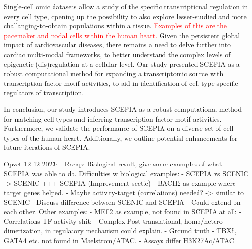 Single-cell omic datasets allow a study of the specific transcriptional regulation in every cell type, opening up the possibility to also explore lesser-studied and more challanging-to-obtain populations within a tissue. \textcolor{red}{Examples of this are the pacemaker and nodal cells within the human heart.} Given the persistent global impact of cardiovascular diseases\cite{Tsao2023}, there remains a need to delve further into cardiac multi-modal frameworks, to better understand the complex levels of epigenetic (dis)regulation at a cellular level. Our study presented SCEPIA as a robust computational method for expanding a transcriptomic source with transcription factor motif activities, to aid in identification of cell type-specific regulators of transcription.

In conclusion, our study introduces SCEPIA as a robust computational method for matching cell types and inferring transcription factor motif activities. Furthermore, we validate the performance of SCEPIA on a diverse set of cell types of the human heart. Additionally, we outline potential enhancements for future iterations of SCEPIA.


Opzet 12-12-2023:
- Recap: Biological result, give some examples of what SCEPIA was able to do. 
Difficulties w biological examples: 
- SCEPIA vs SCENIC -> SCENIC +++ SCEPIA (Improvement sectie)
    - BACH2 as example where target genes helped.
    - Maybe activity-target (correlations) needed? -> similar to SCENIC
    - Discuss difference between SCENIC and SCEPIA
    - Could extend on each other. 
Other examples:
    - MEF2 as example, not found in SCEPIA at all: 
    - Correlations TF-activity shit: 
    - Complex Post translational, homo/hetero-dimerization, in regulatory mechanism could explain. 
- Ground truth
    - TBX5, GATA4 etc. not found in Maelstrom/ATAC.
    - Assays differ H3K27Ac/ATAC



